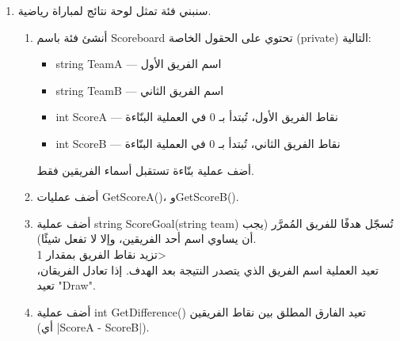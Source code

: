 \documentclass[14pt]{extarticle}
\begin{document}
\begin{enumerate}[itemsep=2em]
{\begin{boxSolution}
\begin{english}
\begin{verbatim}
    Console.WriteLine(tl.Advance()); // Green
    Console.WriteLine(tl.Advance()); // Yellow
    Console.WriteLine(tl.Advance()); // Red  -> CycleCount becomes 1

    Console.WriteLine("IsGo: " + tl.IsGo());
    tl.Print();

    Console.WriteLine(tl.Advance()); // Green
    Console.WriteLine(tl.Advance()); // Yellow
    tl.Print();
}
\end{verbatim}
\end{english}
\end{boxSolution}
}
\fi
\clearpage

\item
سنبني فئة تمثل لوحة نتائج لمباراة رياضية.

\begin{enumerate}[itemsep=1em]
    \item أنشئ فئة باسم \textenglish{Scoreboard} تحتوي على الحقول الخاصة (\textenglish{private}) التالية:
    \begin{itemize}[itemsep=1pt]
        \item \textenglish{string TeamA} — اسم الفريق الأول
        \item \textenglish{string TeamB} — اسم الفريق الثاني
        \item \textenglish{int ScoreA} — نقاط الفريق الأول، تُبتدأ بـ \textenglish{0} في العملية البنّاءة
        \item \textenglish{int ScoreB} — نقاط الفريق الثاني، تُبتدأ بـ \textenglish{0} في العملية البنّاءة
    \end{itemize}
    أضف عملية بنّاءة تستقبل أسماء الفريقين فقط.

    \item أضف عمليات \textenglish{GetScoreA()}، و\textenglish{GetScoreB()}.

    \item أضف عملية \textenglish{string ScoreGoal(string team)} تُسجّل هدفًا للفريق المُمرَّر (يجب أن يساوي اسم أحد الفريقين، وإلا لا تفعل شيئًا).\\
    تزيد نقاط الفريق بمقدار 1>\\
    تعيد العملية اسم الفريق الذي يتصدر النتيجة بعد الهدف. إذا تعادل الفريقان، تعيد \textenglish{"Draw"}.

    \item أضف عملية \textenglish{int GetDifference()} تعيد الفارق المطلق بين نقاط الفريقين\\
    (أي \textenglish{|ScoreA - ScoreB|}).


\end{enumerate}
\end{enumerate}
\end{document}
